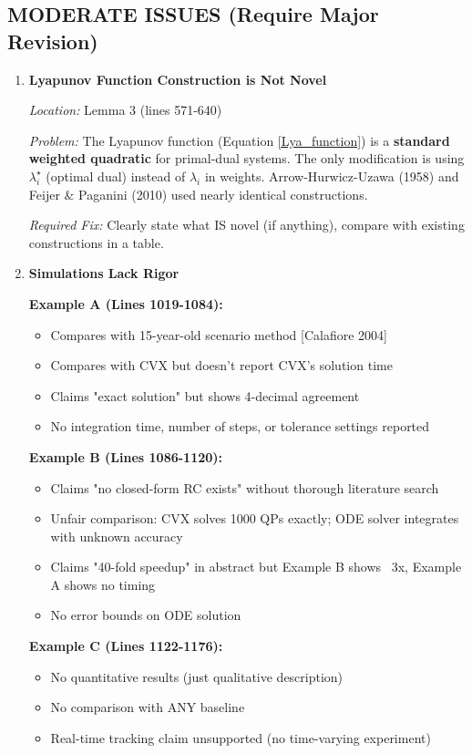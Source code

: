 \documentclass[journal,twoside,web]{ieeecolor}
\begin{document}
\subsection*{MODERATE ISSUES (Require Major Revision)}

\begin{enumerate}[resume]

\item \textbf{Lyapunov Function Construction is Not Novel}

\textit{Location:} Lemma 3 (lines 571-640)

\textit{Problem:} The Lyapunov function (Equation \ref{Lya_function}) is a \textbf{standard weighted quadratic} for primal-dual systems. The only modification is using $\lambda_i^\star$ (optimal dual) instead of $\lambda_i$ in weights. Arrow-Hurwicz-Uzawa (1958) and Feijer \& Paganini (2010) used nearly identical constructions.

\textit{Required Fix:} Clearly state what IS novel (if anything), compare with existing constructions in a table.

\item \textbf{Simulations Lack Rigor}

\textbf{Example A (Lines 1019-1084):}
\begin{itemize}
\item Compares with 15-year-old scenario method [Calafiore 2004]
\item Compares with CVX but doesn't report CVX's solution time
\item Claims "exact solution" but shows 4-decimal agreement
\item No integration time, number of steps, or tolerance settings reported
\end{itemize}

\textbf{Example B (Lines 1086-1120):}
\begin{itemize}
\item Claims "no closed-form RC exists" without thorough literature search
\item Unfair comparison: CVX solves 1000 QPs exactly; ODE solver integrates with unknown accuracy
\item Claims "40-fold speedup" in abstract but Example B shows ~3x, Example A shows no timing
\item No error bounds on ODE solution
\end{itemize}

\textbf{Example C (Lines 1122-1176):}
\begin{itemize}
\item No quantitative results (just qualitative description)
\item No comparison with ANY baseline
\item Real-time tracking claim unsupported (no time-varying experiment)
\end{itemize}


\end{enumerate}
\end{document}
